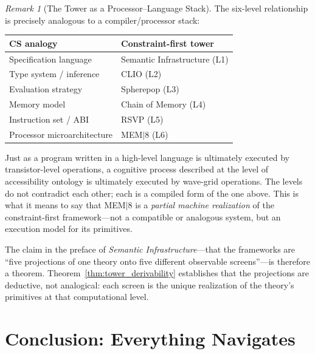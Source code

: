 \documentclass[12pt, a4paper, twoside]{article}
\theoremstyle{plain}
\theoremstyle{definition}
\theoremstyle{remark}
\newtheorem{remark}[theorem]{Remark}
\begin{document}
\begin{remark}[The Tower as a Processor--Language Stack]
The six-level relationship is precisely analogous to a compiler/processor stack:

\begin{center}
\renewcommand{\arraystretch}{1.4}
\begin{tabular}{@{}ll@{}}
\toprule
\textbf{CS analogy} & \textbf{Constraint-first tower} \\
\midrule
Specification language   & Semantic Infrastructure (L1) \\
Type system / inference  & CLIO (L2) \\
Evaluation strategy      & Spherepop (L3) \\
Memory model             & Chain of Memory (L4) \\
Instruction set / ABI    & RSVP (L5) \\
Processor microarchitecture & MEM$|$8 (L6) \\
\bottomrule
\end{tabular}
\end{center}

Just as a program written in a high-level language is ultimately executed by
transistor-level operations, a cognitive process described at the level of
accessibility ontology is ultimately executed by wave-grid operations. The
levels do not contradict each other; each is a compiled form of the one
above. This is what it means to say that MEM$|$8 is a \emph{partial machine
realization} of the constraint-first framework---not a compatible or analogous
system, but an execution model for its primitives.
\end{remark}

The claim in the preface of \emph{Semantic Infrastructure}---that the frameworks
are ``five projections of one theory onto five different observable screens''---is
therefore a theorem. Theorem~\ref{thm:tower_derivability} establishes that the
projections are deductive, not analogical: each screen is the unique
realization of the theory's primitives at that computational level.


\section{Conclusion: Everything Navigates}
\label{sec:conclusion}
\end{document}
